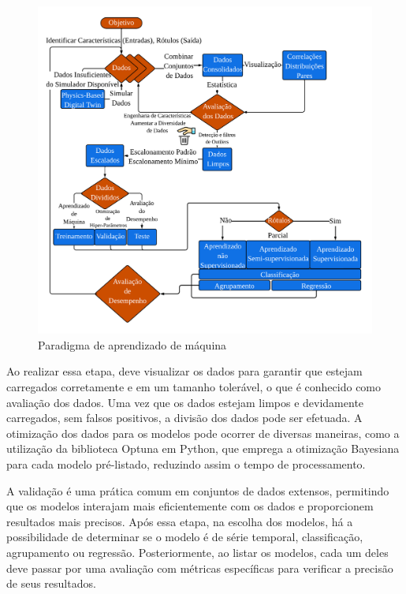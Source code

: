\begin{figure}[!htb]
	\centering
	\caption{Paradigma de aprendizado de máquina}
	\includegraphics[width=\linewidth]{Introducao/Figuras/paradigma-ml}
	
	\label{fig:paradigma-ml}
\end{figure}

Ao realizar essa etapa, deve visualizar os dados para garantir que estejam carregados corretamente e em um tamanho tolerável, o que é conhecido como avaliação dos dados. Uma vez que os dados estejam limpos e devidamente carregados, sem falsos positivos, a divisão dos dados pode ser efetuada.
A otimização dos dados para os modelos pode ocorrer de diversas maneiras, como a utilização da biblioteca Optuna em Python, que emprega a otimização Bayesiana para cada modelo pré-listado, reduzindo assim o tempo de processamento.

A validação é uma prática comum em conjuntos de dados extensos, permitindo que os modelos interajam mais eficientemente com os dados e proporcionem resultados mais precisos. Após essa etapa, na escolha dos modelos, há a possibilidade de determinar se o modelo é de série temporal, classificação, agrupamento ou regressão. Posteriormente, ao listar os modelos, cada um deles deve passar por uma avaliação com métricas específicas para verificar a precisão de seus resultados.


